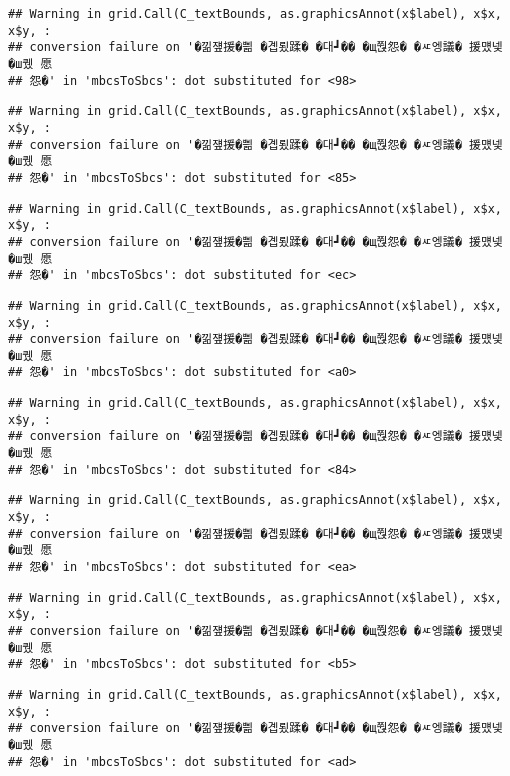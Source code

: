 \documentclass[
]{article}
\begin{document}
\begin{verbatim}
## Warning in grid.Call(C_textBounds, as.graphicsAnnot(x$label), x$x, x$y, :
## conversion failure on '�낆쟾援�쁾 �곕룄蹂� �대┛�� �щ쭩怨� �ㅼ엥議� 援먰넻�ш퀬 愿
## 怨�' in 'mbcsToSbcs': dot substituted for <98>
\end{verbatim}

\begin{verbatim}
## Warning in grid.Call(C_textBounds, as.graphicsAnnot(x$label), x$x, x$y, :
## conversion failure on '�낆쟾援�쁾 �곕룄蹂� �대┛�� �щ쭩怨� �ㅼ엥議� 援먰넻�ш퀬 愿
## 怨�' in 'mbcsToSbcs': dot substituted for <85>
\end{verbatim}

\begin{verbatim}
## Warning in grid.Call(C_textBounds, as.graphicsAnnot(x$label), x$x, x$y, :
## conversion failure on '�낆쟾援�쁾 �곕룄蹂� �대┛�� �щ쭩怨� �ㅼ엥議� 援먰넻�ш퀬 愿
## 怨�' in 'mbcsToSbcs': dot substituted for <ec>
\end{verbatim}

\begin{verbatim}
## Warning in grid.Call(C_textBounds, as.graphicsAnnot(x$label), x$x, x$y, :
## conversion failure on '�낆쟾援�쁾 �곕룄蹂� �대┛�� �щ쭩怨� �ㅼ엥議� 援먰넻�ш퀬 愿
## 怨�' in 'mbcsToSbcs': dot substituted for <a0>
\end{verbatim}

\begin{verbatim}
## Warning in grid.Call(C_textBounds, as.graphicsAnnot(x$label), x$x, x$y, :
## conversion failure on '�낆쟾援�쁾 �곕룄蹂� �대┛�� �щ쭩怨� �ㅼ엥議� 援먰넻�ш퀬 愿
## 怨�' in 'mbcsToSbcs': dot substituted for <84>
\end{verbatim}

\begin{verbatim}
## Warning in grid.Call(C_textBounds, as.graphicsAnnot(x$label), x$x, x$y, :
## conversion failure on '�낆쟾援�쁾 �곕룄蹂� �대┛�� �щ쭩怨� �ㅼ엥議� 援먰넻�ш퀬 愿
## 怨�' in 'mbcsToSbcs': dot substituted for <ea>
\end{verbatim}

\begin{verbatim}
## Warning in grid.Call(C_textBounds, as.graphicsAnnot(x$label), x$x, x$y, :
## conversion failure on '�낆쟾援�쁾 �곕룄蹂� �대┛�� �щ쭩怨� �ㅼ엥議� 援먰넻�ш퀬 愿
## 怨�' in 'mbcsToSbcs': dot substituted for <b5>
\end{verbatim}

\begin{verbatim}
## Warning in grid.Call(C_textBounds, as.graphicsAnnot(x$label), x$x, x$y, :
## conversion failure on '�낆쟾援�쁾 �곕룄蹂� �대┛�� �щ쭩怨� �ㅼ엥議� 援먰넻�ш퀬 愿
## 怨�' in 'mbcsToSbcs': dot substituted for <ad>
\end{verbatim}
\end{document}
